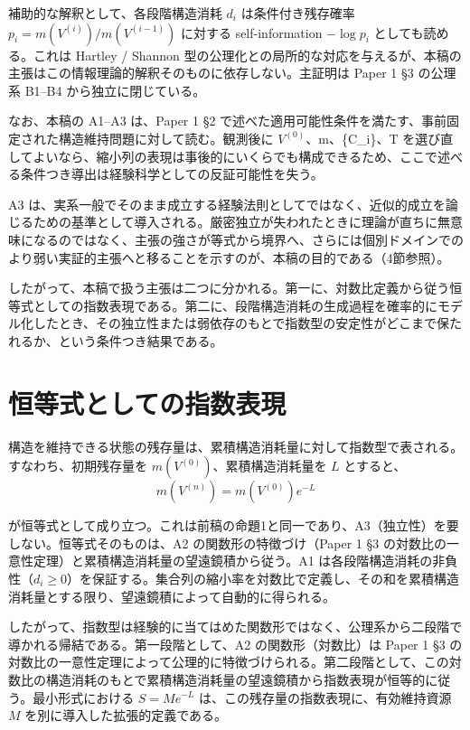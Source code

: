 \documentclass[12pt,a4paper]{article}
\begin{document}
補助的な解釈として、各段階構造消耗 \(d_i\) は条件付き残存確率 \(p_i = m(V^{(i)})/m(V^{(i-1)})\) に対する self-information \(-\log p_i\) としても読める。これは Hartley / Shannon 型の公理化との局所的な対応を与えるが、本稿の主張はこの情報理論的解釈そのものに依存しない。主証明は Paper 1 §3 の公理系 B1--B4 から独立に閉じている。

なお、本稿の A1--A3 は、Paper 1 §2 で述べた適用可能性条件を満たす、事前固定された構造維持問題に対して読む。観測後に \(V^{(0)}\)、m、\{C\_i\}、T を選び直してよいなら、縮小列の表現は事後的にいくらでも構成できるため、ここで述べる条件つき導出は経験科学としての反証可能性を失う。

A3 は、実系一般でそのまま成立する経験法則としてではなく、近似的成立を論じるための基準として導入される。厳密独立が失われたときに理論が直ちに無意味になるのではなく、主張の強さが等式から境界へ、さらには個別ドメインでのより弱い実証的主張へと移ることを示すのが、本稿の目的である（4節参照）。

したがって、本稿で扱う主張は二つに分かれる。第一に、対数比定義から従う恒等式としての指数表現である。第二に、段階構造消耗の生成過程を確率的にモデル化したとき、その独立性または弱依存のもとで指数型の安定性がどこまで保たれるか、という条件つき結果である。

\section{恒等式としての指数表現}\label{ux6052ux7b49ux5f0fux3068ux3057ux3066ux306eux6307ux6570ux8868ux73fe}

構造を維持できる状態の残存量は、累積構造消耗量に対して指数型で表される。すなわち、初期残存量を \(m(V^{(0)})\)、累積構造消耗量を \(L\) とすると、 \[
m(V^{(n)}) = m(V^{(0)}) e^{-L}
\]

が恒等式として成り立つ。これは前稿の命題1と同一であり、A3（独立性）を要しない。恒等式そのものは、A2 の関数形の特徴づけ（Paper 1 §3 の対数比の一意性定理）と累積構造消耗量の望遠鏡積から従う。A1 は各段階構造消耗の非負性（\(d_i \ge 0\)）を保証する。集合列の縮小率を対数比で定義し、その和を累積構造消耗量とする限り、望遠鏡積によって自動的に得られる。

したがって、指数型は経験的に当てはめた関数形ではなく、公理系から二段階で導かれる帰結である。第一段階として、A2 の関数形（対数比）は Paper 1 §3 の対数比の一意性定理によって公理的に特徴づけられる。第二段階として、この対数比の構造消耗のもとで累積構造消耗量の望遠鏡積から指数表現が恒等的に従う。最小形式における \(S = M e^{-L}\) は、この残存量の指数表現に、有効維持資源 \(M\) を別に導入した拡張的定義である。
\end{document}
